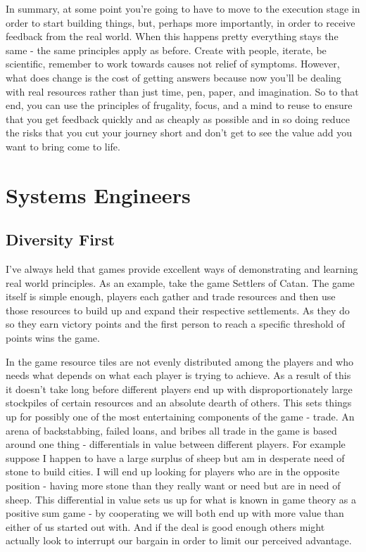 \documentclass[11pt,a5paper]{book}
\begin{document}
In summary, at some point you're going to have to move to the execution stage in order to start building things, but, perhaps more importantly, in order to receive feedback from the real world. When this happens pretty everything stays the same - the same principles apply as before. Create with people, iterate, be scientific, remember to work towards causes not relief of symptoms. However, what does change is the cost of getting answers because now you'll be dealing with real resources rather than just time, pen, paper, and imagination. So to that end, you can use the principles of frugality, focus, and a mind to reuse to ensure that you get feedback quickly and as cheaply as possible and in so doing reduce the risks that you cut your journey short and don't get to see the value add you want to bring come to life. 






\chapter{Systems Engineers}
\section{Diversity First}
I've always held that games provide excellent ways of demonstrating and learning real world principles. As an example, take the game Settlers of Catan. The game itself is simple enough, players each gather and trade resources and then use those resources to build up and expand their respective settlements. As they do so they earn victory points and the first person to reach a specific threshold of points wins the game. 
\newline

In the game resource tiles are not evenly distributed among the players and who needs what depends on what each player is trying to achieve. As a result of this it doesn't take long before different players end up with disproportionately large stockpiles of certain resources and an absolute dearth of others. This sets things up for possibly one of the most entertaining components of the game - trade. An arena of backstabbing, failed loans, and bribes all trade in the game is based around one thing - differentials in value between different players. For example suppose I happen to have a large surplus of sheep but am in desperate need of stone to build cities. I will end up looking for players who are in the opposite position - having more stone than they really want or need but are in need of sheep. This differential in value sets us up for what is known in game theory as a positive sum game - by cooperating we will both end up with more value than either of us started out with. And if the deal is good enough others might actually look to interrupt our bargain in order to limit our perceived advantage. 
\newline
\end{document}
